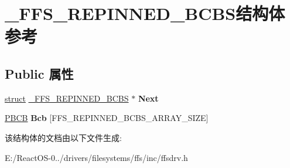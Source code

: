 \hypertarget{struct___f_f_s___r_e_p_i_n_n_e_d___b_c_b_s}{}\section{\+\_\+\+F\+F\+S\+\_\+\+R\+E\+P\+I\+N\+N\+E\+D\+\_\+\+B\+C\+B\+S结构体 参考}
\label{struct___f_f_s___r_e_p_i_n_n_e_d___b_c_b_s}
\subsection*{Public 属性}
\begin{DoxyCompactItemize}
\item 
\mbox{\label{struct___f_f_s___r_e_p_i_n_n_e_d___b_c_b_s_a003951a436627a3c49fdbd4aa1b25bd1}} 
\hyperlink{interfacestruct}{struct} \hyperlink{struct___f_f_s___r_e_p_i_n_n_e_d___b_c_b_s}{\+\_\+\+F\+F\+S\+\_\+\+R\+E\+P\+I\+N\+N\+E\+D\+\_\+\+B\+C\+BS} $\ast$ {\bfseries Next}
\item 
\mbox{\label{struct___f_f_s___r_e_p_i_n_n_e_d___b_c_b_s_af86a8532eac2f754363b864aa27e9638}} 
\hyperlink{interfacevoid}{P\+B\+CB} {\bfseries Bcb} \mbox{[}F\+F\+S\+\_\+\+R\+E\+P\+I\+N\+N\+E\+D\+\_\+\+B\+C\+B\+S\+\_\+\+A\+R\+R\+A\+Y\+\_\+\+S\+I\+ZE\mbox{]}
\end{DoxyCompactItemize}


该结构体的文档由以下文件生成\+:\begin{DoxyCompactItemize}
\item 
E\+:/\+React\+O\+S-\/0../drivers/filesystems/ffs/inc/ffsdrv.\+h\end{DoxyCompactItemize}
